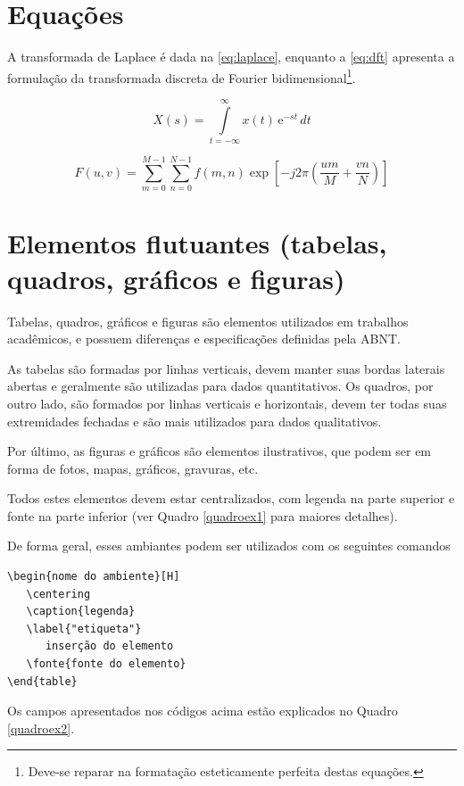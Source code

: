  
\section{Equações}
\label{sec:equacoes}

A transformada de Laplace é dada na \autoref{eq:laplace}, enquanto a \autoref{eq:dft} apresenta a formulação da transformada discreta de Fourier bidimensional\footnote{Deve-se reparar na formatação esteticamente perfeita destas equações.}.


\begin{equation}
    X(s) = \int\limits_{t = -\infty}^{\infty} x(t) \, \text{e}^{-st} \, dt
    \label{eq:laplace}
\end{equation}

\begin{equation}
    F(u, v) = \sum_{m = 0}^{M - 1} \sum_{n = 0}^{N - 1} f(m, n) \exp \left[ -j 2 \pi \left( \frac{u m}{M} + \frac{v n}{N} \right) \right]
    \label{eq:dft}
\end{equation}


\section{Elementos flutuantes (tabelas, quadros, gráficos e figuras)}

Tabelas, quadros, gráficos e figuras são elementos utilizados em trabalhos acadêmicos, e possuem diferenças e especificações definidas pela ABNT.

As tabelas são formadas por linhas verticais, devem manter suas bordas laterais abertas e geralmente são utilizadas para dados quantitativos. Os quadros, por outro lado, são formados por linhas verticais e horizontais, devem ter todas suas extremidades fechadas e são mais utilizados para dados qualitativos.

Por último, as figuras e gráficos são elementos ilustrativos, que podem ser em forma de fotos, mapas, gráficos, gravuras, etc.

Todos estes elementos devem estar centralizados, com legenda na parte superior e fonte na parte inferior (ver Quadro \ref{quadroex1} para maiores detalhes).

De forma geral, esses ambiantes podem ser utilizados com os seguintes comandos



\begin{verbatim}
\begin{nome do ambiente}[H]
   \centering
   \caption{legenda}
   \label{"etiqueta"}
      inserção do elemento 
   \fonte{fonte do elemento}
\end{table}
\end{verbatim}
Os campos apresentados nos códigos acima estão explicados no Quadro \ref{quadroex2}.



